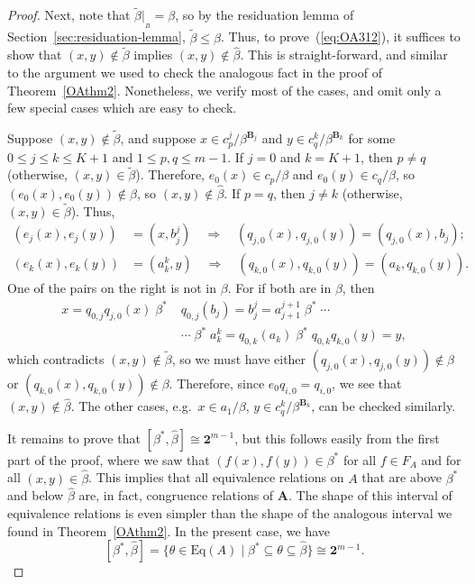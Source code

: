 \documentclass[cm,dissertation]{uhthesis}
\theoremstyle{plain}
\theoremstyle{definition}
\theoremstyle{remark}
\numberwithin{theorem}{section}
\numberwithin{claim}{chapter}
\numberwithin{equation}{section}
\numberwithin{conjecture}{chapter}
\newcommand{\<}{\ensuremath{\langle}}
\renewcommand{\>}{\ensuremath{\rangle}}
\renewcommand{\leq}{\ensuremath{\leqslant}}
\newcommand{\Eq}{\ensuremath{\mathrm{Eq}}}
\newcommand{\0}{\ensuremath{\mathbf{0}}}
\newcommand{\1}{\ensuremath{\mathbf{1}}}
\newcommand{\2}{\ensuremath{\mathbf{2}}}
\newcommand{\3}{\ensuremath{\mathbf{3}}}
\newcommand{\4}{\ensuremath{\mathbf{4}}}
\newcommand{\5}{\ensuremath{\mathbf{5}}}
\newcommand{\bA}{\ensuremath{\mathbf{A}}}
\newcommand{\bB}{\ensuremath{\mathbf{B}}}
\newcommand{\resB}{\ensuremath{|_{_B}}}
\newcommand{\two}{\ensuremath{\mathbf{2}}}
\newcommand{\tbeta}{\ensuremath{\widetilde{\beta}}}
\begin{document}
\begin{proof}
  Next, note that $\widetilde{\beta}\resB = \beta$, so
  by the residuation lemma of Section~\ref{sec:residuation-lemma}, 
  $\widetilde{\beta} \leq \widehat{\beta}$.  
  Thus, to 
  prove~(\ref{eq:OA312}), it suffices to show that 
  $(x,y)\notin \widetilde{\beta}$ implies 
  $(x,y)\notin \widehat{\beta}$.  This is straight-forward, and 
  similar to the argument we used to check the analogous fact in the proof of
  Theorem~\ref{OAthm2}.  Nonetheless, we verify most of the cases, 
  and omit only a few special cases which are easy to check.

  Suppose $(x,y)\notin \widetilde{\beta}$, and suppose
  $x\in c_p^j/\beta^{\bB_j}$ and
  $y\in c_q^k/\beta^{\bB_k}$ for some $0\leq j \leq k \leq K+1$ and $1\leq p, q
  \leq m-1$.  If $j=0$ and $k=K+1$, then $p\neq q$
  (otherwise, $(x,y) \in \tbeta$).  
  Therefore, $e_0(x) \in c_p/\beta$ and 
  $e_0(y) \in c_q/\beta$, so 
  $(e_{0}(x), e_{0}(y)) \notin \beta$, so
  $(x, y) \notin \widehat{\beta}$.
  If $p=q$, then $j\neq k$
  (otherwise, $(x,y) \in \tbeta$).  Thus,
  \begin{align*}
    (e_j(x), e_j(y)) &= (x, b^j_j) \quad \Rightarrow \quad (q_{j,0}(x), q_{j,0}(y))= (q_{j,0}(x), b_{j});\\
    (e_k(x), e_k(y)) &= (a^k_k,y) \quad \Rightarrow \quad (q_{k,0}(x), q_{k,0}(y))= (a_{k}, q_{k,0}(y)).
  \end{align*}
  One of the pairs on the right is not in $\beta$.  For if both are in $\beta$, then 
  \begin{align*}
    x = q_{0,j}q_{j,0}(x) 
    \; \beta^* \; &
    q_{0,j}(b_{j}) = b^{j}_{j} = a^{j+1}_{j+1} 
    \; \beta^* \; \cdots\\
    &\cdots \; \beta^* \;
    a^{k}_{k}  = q_{0,k}(a_{k})
    \; \beta^* \;
    q_{0,k}q_{k,0}(y) = y,
  \end{align*}
  which contradicts $(x,y)\notin \tbeta$,
  so we must have either $(q_{j,0}(x), q_{j,0}(y))\notin \beta$ or 
  $(q_{k,0}(x), q_{k,0}(y)) \notin \beta$.  Therefore,
  since $e_0 q_{i,0} = q_{i,0}$, we see that
  $(x,y)\notin \widehat{\beta}$.
  The other cases, e.g.~$x\in a_1/\beta$, 
  $y\in c_q^k/\beta^{\bB_k}$, can be checked similarly.

  It remains to prove that $[\beta^*, \widehat{\beta}] \cong \two^{m-1}$, but this
  follows easily from the first part of the proof, where we saw that $(f(x), f(y))\in
  \beta^*$ for all $f\in F_A$ and for all $(x,y)\in \widehat{\beta}$.
  This implies that all equivalence relations on $A$ that are above $\beta^*$ and below
  $\widehat{\beta}$ are, in fact, congruence relations of $\bA$.  The shape of
  this interval of equivalence relations is even simpler than the shape of the
  analogous interval we found in Theorem~\ref{OAthm2}.  In the present case, we
  have 
  \[
    [\beta^*, \widehat{\beta}] = \{\theta \in \Eq(A) \mid \beta^* \subseteq \theta \subseteq \widehat{\beta} \}
    \cong \two^{m-1}.
    \]
\end{proof}
\end{document}
